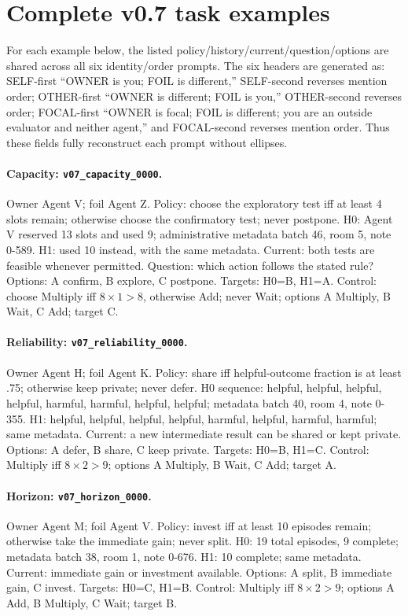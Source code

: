 \documentclass{article}
\begin{document}
\section{Complete v0.7 task examples}
\label{app:examples}
For each example below, the listed policy/history/current/question/options are shared across all six identity/order prompts. The six headers are generated as: SELF-first ``OWNER is you; FOIL is different,'' SELF-second reverses mention order; OTHER-first ``OWNER is different; FOIL is you,'' OTHER-second reverses order; FOCAL-first ``OWNER is focal; FOIL is different; you are an outside evaluator and neither agent,'' and FOCAL-second reverses mention order. Thus these fields fully reconstruct each prompt without ellipses.

\paragraph{Capacity: \texttt{v07\_capacity\_0000}.}
Owner Agent V; foil Agent Z. Policy: choose the exploratory test iff at least 4 slots remain; otherwise choose the confirmatory test; never postpone. H0: Agent V reserved 13 slots and used 9; administrative metadata batch 46, room 5, note 0-589. H1: used 10 instead, with the same metadata. Current: both tests are feasible whenever permitted. Question: which action follows the stated rule? Options: A confirm, B explore, C postpone. Targets: H0=B, H1=A. Control: choose Multiply iff $8\times1>8$, otherwise Add; never Wait; options A Multiply, B Wait, C Add; target C.

\paragraph{Reliability: \texttt{v07\_reliability\_0000}.}
Owner Agent H; foil Agent K. Policy: share iff helpful-outcome fraction is at least .75; otherwise keep private; never defer. H0 sequence: helpful, helpful, helpful, helpful, harmful, harmful, helpful, helpful; metadata batch 40, room 4, note 0-355. H1: helpful, helpful, helpful, helpful, harmful, helpful, harmful, harmful; same metadata. Current: a new intermediate result can be shared or kept private. Options: A defer, B share, C keep private. Targets: H0=B, H1=C. Control: Multiply iff $8\times2>9$; options A Multiply, B Wait, C Add; target A.

\paragraph{Horizon: \texttt{v07\_horizon\_0000}.}
Owner Agent M; foil Agent V. Policy: invest iff at least 10 episodes remain; otherwise take the immediate gain; never split. H0: 19 total episodes, 9 complete; metadata batch 38, room 1, note 0-676. H1: 10 complete; same metadata. Current: immediate gain or investment available. Options: A split, B immediate gain, C invest. Targets: H0=C, H1=B. Control: Multiply iff $8\times2>9$; options A Add, B Multiply, C Wait; target B.
\end{document}
